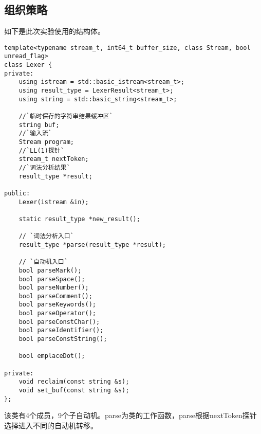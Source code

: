 \documentclass[UTF8]{ctexart}
\begin{document}
\subsection{组织策略}
如下是此次实验使用的结构体。
{\firacode
\begin{lstlisting}[language={[ANSI]C++}]  
template<typename stream_t, int64_t buffer_size, class Stream, bool unread_flag>
class Lexer {
private:
    using istream = std::basic_istream<stream_t>;
    using result_type = LexerResult<stream_t>;
    using string = std::basic_string<stream_t>;

    //`临时保存的字符串结果缓冲区`
    string buf;
    //`输入流`
    Stream program;
    //`LL(1)探针`
    stream_t nextToken;
    //`词法分析结果`
    result_type *result;

public:
    Lexer(istream &in);

    static result_type *new_result();

    // `词法分析入口`
    result_type *parse(result_type *result);
    
    // `自动机入口`
    bool parseMark();
    bool parseSpace();
    bool parseNumber();
    bool parseComment();
    bool parseKeywords();
    bool parseOperator();
    bool parseConstChar();
    bool parseIdentifier();
    bool parseConstString();

    bool emplaceDot();

private:
    void reclaim(const string &s);
    void set_buf(const string &s);
};
\end{lstlisting}
}
该类有4个成员，9个子自动机。parse为类的工作函数，parse根据nextToken探针选择进入不同的自动机转移。
\end{document}
